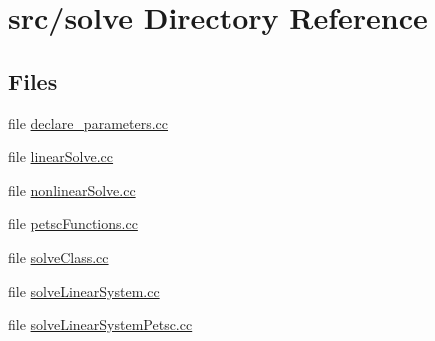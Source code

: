 \section{src/solve Directory Reference}
\label{dir_5ad05585953fed8aa95226173947fe38}
\subsection*{Files}
\begin{DoxyCompactItemize}
\item 
file \hyperlink{declare__parameters_8cc}{declare\-\_\-parameters.\-cc}
\item 
file \hyperlink{linear_solve_8cc}{linear\-Solve.\-cc}
\item 
file \hyperlink{nonlinear_solve_8cc}{nonlinear\-Solve.\-cc}
\item 
file \hyperlink{petsc_functions_8cc}{petsc\-Functions.\-cc}
\item 
file \hyperlink{solve_class_8cc}{solve\-Class.\-cc}
\item 
file \hyperlink{solve_linear_system_8cc}{solve\-Linear\-System.\-cc}
\item 
file \hyperlink{solve_linear_system_petsc_8cc}{solve\-Linear\-System\-Petsc.\-cc}
\end{DoxyCompactItemize}
